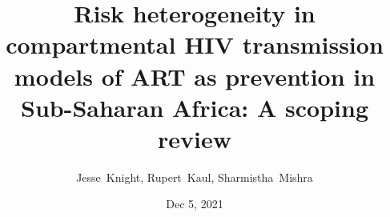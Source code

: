 \title{Risk heterogeneity in compartmental HIV transmission models of
  ART as prevention in Sub-Saharan Africa: A scoping review}
\author{Jesse~Knight, Rupert~Kaul, Sharmistha~Mishra}
\date{Dec 5, 2021}